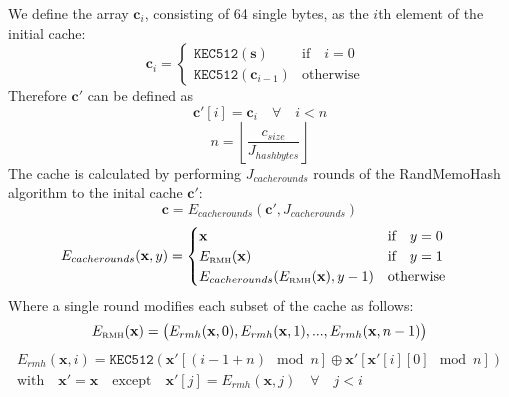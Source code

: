 \documentclass[9pt,oneside]{amsart}
\begin{document}
We define the array $\mathbf{c}_{i}$, consisting of 64 single bytes,  as the $i$th element of the initial cache:
\begin{equation}
 \mathbf{c}_{i} = \begin{cases}
\texttt{KEC512}(\mathbf{s}) & \text{if} \quad i = 0 \quad  \\
\texttt{KEC512}(\mathbf{c}_{i-1}) & \text{otherwise}
\end{cases}
\end{equation}
Therefore $ \mathbf{c'}$ can be defined as
\begin{equation}
 \mathbf{c'}[i] = \mathbf{c}_{i} \quad \forall \quad i < n
\end{equation}
\begin{equation}
 n = \left\lfloor\frac{c_{size}}{J_{hashbytes}}\right\rfloor
\end{equation}
The cache is calculated by performing $J_{cacherounds}$ rounds of the RandMemoHash algorithm to the inital cache $\mathbf{c'}$:
\begin{equation}
 \mathbf{c} = E_{cacherounds}(\mathbf{c'}, J_{cacherounds})
\end{equation}
\begin{equation}
 E_{cacherounds}(\mathbf{x}, y) = \begin{cases}
\mathbf{x} & \text{if} \quad y = 0 \quad  \\
E_\text{\tiny RMH}(\mathbf{x}) & \text{if} \quad y = 1 \quad  \\
E_{cacherounds}(E_\text{\tiny RMH}(\mathbf{x}), y -1 ) & \text{otherwise}
\end{cases}
\end{equation}
Where a single round modifies each subset of the cache as follows:
\begin{equation}
 E_\text{\tiny RMH}(\mathbf{x}) = \big( E_{rmh}(\mathbf{x}, 0), E_{rmh}(\mathbf{x}, 1), ... , E_{rmh}(\mathbf{x}, n - 1) \big)
\end{equation}
\begin{multline}
  E_{rmh}(\mathbf{x}, i) = \texttt{KEC512}(\mathbf{x'}[(i - 1 + n) \mod n] \oplus \mathbf{x'}[\mathbf{x'}[i][0] \mod n]) \\
  \text{with} \quad \mathbf{x'} = \mathbf{x} \quad \text{except} \quad \mathbf{x'}[j] = E_{rmh}(\mathbf{x}, j) \quad \forall \quad j < i
\end{multline}
\end{document}
